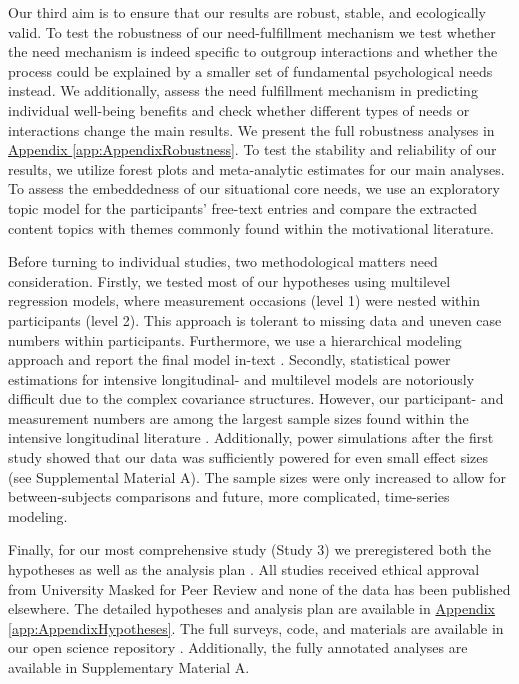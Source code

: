 \documentclass[man, 12pt, a4paper, mask]{apa7}
\theoremstyle{break}
\theoremstyle{plain}
\newcommand{\appref}[2][]{\hyperref[#2]{Appendix \ref*{#2}#1}}
\begin{document}
Our third aim is to ensure that our results are robust, stable, and ecologically valid. To test the robustness of our need-fulfillment mechanism we test whether the need mechanism is indeed specific to outgroup interactions and whether the process could be explained by a smaller set of fundamental psychological needs instead. We additionally, assess the need fulfillment mechanism in predicting individual well-being benefits and check whether different types of needs or interactions change the main results. We present the full robustness analyses in \appref{app:AppendixRobustness}. To test the stability and reliability of our results, we utilize forest plots and meta-analytic estimates for our main analyses. To assess the embeddedness of our situational core needs, we use an exploratory topic model for the participants' free-text entries and compare the extracted content topics with themes commonly found within the motivational literature.

Before turning to individual studies, two methodological matters need consideration. Firstly, we tested most of our hypotheses using multilevel regression models, where measurement occasions (level 1) were nested within participants (level 2). This approach is tolerant to missing data and uneven case numbers within participants. Furthermore, we use a hierarchical modeling approach and report the final model in-text \citep[][; for the full modeling process see Supplementary Material A]{snijders2012}. Secondly, statistical power estimations for intensive longitudinal- and multilevel models are notoriously difficult due to the complex covariance structures. However, our participant- and measurement numbers are among the largest sample sizes found within the intensive longitudinal literature \citep[e.g.,][]{AanhetRot2012}. Additionally, power simulations after the first study showed that our data was sufficiently powered for even small effect sizes (see Supplemental Material A). The sample sizes were only increased to allow for between-subjects comparisons and future, more complicated, time-series modeling.

Finally, for our most comprehensive study (Study 3) we preregistered both the hypotheses as well as the analysis plan \citep[available at][]{KreienkampMasked2021f}. All studies received ethical approval from University Masked for Peer Review and none of the data has been published elsewhere. The detailed hypotheses and analysis plan are available in \appref{app:AppendixHypotheses}. The full surveys, code, and materials are available in our open science repository \citep[including a complete codebook;][]{KreienkampMasked2022a}. Additionally, the fully annotated analyses are available in Supplementary Material A.
\end{document}
